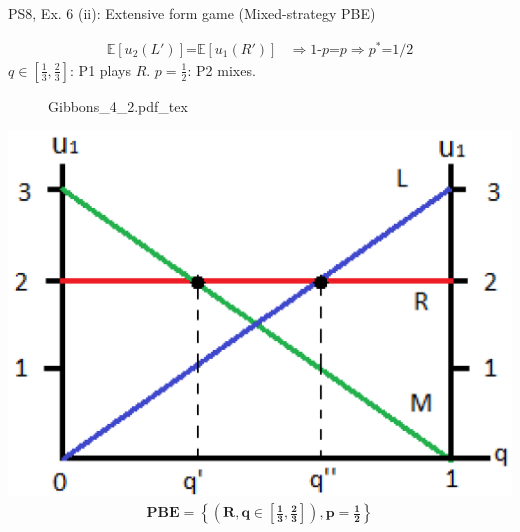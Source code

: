 \begin{frame}{PS8, Ex. 6 (ii): Extensive form game (Mixed-strategy PBE)}
\begin{multicols}{2}
      \begin{align*}
        \mathbb{E}[u_2(L')]\text{=}\mathbb{E}[u_1(R')]&\Rightarrow \text{1-}p\text{=}p\Rightarrow p^*\text{=}1/2
      \end{align*}
      $q\in$$\left[\frac{1}{3},\frac{2}{3}\right]$: P1 plays $R$. $p=\frac{1}{2}$: P2 mixes.
      \vfill\null\columnbreak
      \begin{figure}[!h]
        \center {}
        {Gibbons_4_2.pdf_tex}
      \end{figure}
      \includegraphics[width=1.1\columnwidth]{figures/Gibbons_4_2_E[u]}
      \vspace{-16pt}
      \begin{align*}
        \bm{PBE=\left\{\left(R,q\in\left[\frac{1}{3},\frac{2}{3}\right]\right),p=\frac{1}{2}\right\}}
      \end{align*}
      \vfill\null
    \end{multicols}
\end{frame}
